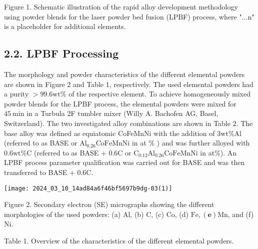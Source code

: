 \documentclass[10pt]{article}
\begin{document}
Figure 1. Schematic illustration of the rapid alloy development methodology using powder blends for the laser powder bed fusion (LPBF) process, where "...n" is a placeholder for additional elements.

\subsection*{2.2. LPBF Processing}
The morphology and powder characteristics of the different elemental powders are shown in Figure 2 and Table 1, respectively. The used elemental powders had a purity $>99.6 \mathrm{wt} \%$ of the respective element. To achieve homogeneously mixed powder blends for the LPBF process, the elemental powders were mixed for $45 \mathrm{~min}$ in a Turbula 2F tumbler mixer (Willy A. Bachofen AG, Basel, Switzerland). The two investigated alloy combinations are shown in Table 2. The base alloy was defined as equiatomic CoFeMnNi with the addition of $3 \mathrm{wt} \% \mathrm{Al}$ (referred to as BASE or $\mathrm{Al}_{0.26} \mathrm{CoFeMnNi}$ in at $\%$ ) and was further alloyed with $0.6 \mathrm{wt} \% \mathrm{C}$ (referred to as BASE + 0.6C or $\mathrm{C}_{0.12} \mathrm{Al}_{0.26} \mathrm{CoFeMnNi}$ in at\%). An LPBF process parameter qualification was carried out for BASE and was then transferred to BASE + 0.6C.

\begin{center}
\texttt{[image: 2024\_03\_10\_14ad84a6f46bf5697b9dg-03(1)]}
\end{center}

Figure 2. Secondary electron (SE) micrographs showing the different morphologies of the used powders: (a) $\mathrm{Al}$, (b) $\mathrm{C}$, (c) $\mathrm{Co}$, (d) $\mathrm{Fe},(\mathbf{e}) \mathrm{Mn}$, and (f) Ni.

Table 1. Overview of the characteristics of the different elemental powders.
\end{document}
